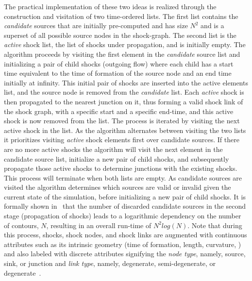 The practical implementation of these two ideas is realized through the construction and visitation of two time-ordered lists. The first list contains the \emph{candidate} sources that are initially pre-computed and has size $N^2$ and is a superset of all possible source nodes in the shock-graph. The second list is the \emph{active} shock list, the list of shocks under propagation, and is initially empty. The algorithm proceeds by visiting the first element in the \emph{candidate} source list and initializing a pair of child shocks (outgoing flow) where each child has a start time equivalent to the time of formation of the source node and an end time initially at infinity. This initial pair of shocks are inserted into the active elements list, and the source node is removed from the \emph{candidate} list. Each \emph{active} shock is then propagated to the nearest junction on it, thus forming a valid shock link of the shock graph, with a specific start and a specific end-time, and this active shock is now removed from the list. The process is iterated by visiting the next active shock in the list. As the algorithm alternates between visiting the two lists it prioritizes visiting \emph{active} shock elements first over candidate sources. If there are no more active shocks the algorithm will visit the next element in the candidate source list, initialize a new pair of child shocks, and subsequently propagate those active shocks to determine junctions with the existing shocks. This process will terminate when both lists are empty. As candidate sources are visited the algorithm determines which sources are valid or invalid given the current state of the simulation, before initializing a new pair of child shocks. It is formally shown in~\cite{Tamrakar:Kimia:Shock} that the number of discarded candidate sources in the second stage (propagation of shocks) leads to a logarithmic dependency on the number of contours, $N$, resulting in an overall run-time of $N^2log(N)$. Note that during this process, shocks, shock nodes, and shock links are augmented with continuous attributes such as its intrinsic geometry (time of formation, length, curvature, \etc) and also labeled with discrete attributes signifying the \emph{node type}, namely, source, sink, or junction and \emph{link type}, namely, degenerate, semi-degenerate, or degenerate~\cite{Giblin:Kimia:IJCV03}. 









